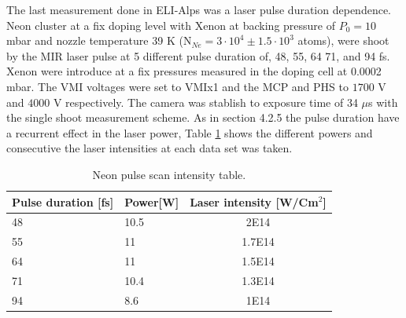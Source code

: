 The last measurement done in ELI-Alps was a laser pulse duration dependence. Neon cluster at a fix doping level with Xenon at backing pressure of $P_{0}=10$ mbar and nozzle temperature 39 K (N$_{Ne}=3\cdot 10^{4}\pm 1.5\cdot 10^{3}$ atoms), were shoot by the MIR laser pulse at 5 different pulse duration of, 48, 55, 64 71, and 94 fs. Xenon were introduce at a fix pressures measured in the doping cell at 0.0002 mbar. The VMI voltages were set to VMIx1 and the MCP and PHS to $1700$ V and $4000$ V respectively. The camera was stablish to exposure time of 34 $\mu$s with the single shoot measurement scheme. As in section 4.2.5 the pulse duration have a recurrent effect in the laser power, Table \ref{tab:Neonpulsepower} shows the different powers and consecutive the laser intensities at each data set was taken.

\begin{table}[t]
\centering

\begin{tabular}{|l|l|c|}
\hline
Pulse duration {[}fs{]} & \multicolumn{1}{c|}{Power{[}W{]}} & Laser intensity {[}W/Cm$^{2}${]} \\ \hline
48 & 10.5 & 2E14 \\ \hline
55 & 11 & 1.7E14 \\ \hline
64 & 11 & 1.5E14 \\ \hline
71 & 10.4 & 1.3E14 \\ \hline
94 & 8.6 & 1E14 \\ \hline
\end{tabular}
\caption{Neon pulse scan  intensity table.}
\label{tab:Neonpulsepower}
\end{table}


